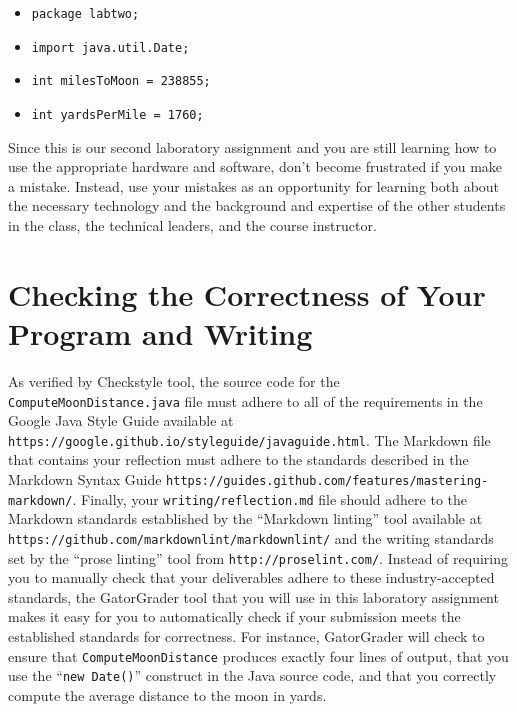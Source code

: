 \documentclass[11pt]{article}
\newcommand{\mainprogram}{\lstinline{ComputeMoonDistance}}
\newcommand{\mainprogramjava}{\lstinline{ComputeMoonDistance.java}}
\newcommand{\reflection}{\lstinline{writing/reflection.md}}
\newcommand{\command}[1]{``\lstinline{#1}''}
\newcommand{\program}[1]{\lstinline{#1}}
\newcommand{\url}[1]{\lstinline{#1}}
\newcommand{\step}[1]{``{#1}''}
\begin{document}
\vspace*{-.1in}
\begin{itemize}
  \setlength{\itemsep}{0pt}

  \item \program{package labtwo;}
  \item \program{import java.util.Date;}
  \item \program{int milesToMoon = 238855;}
  \item \program{int yardsPerMile = 1760;}

\end{itemize}
\vspace*{-.1in}

Since this is our second laboratory assignment and you are still learning how
to use the appropriate hardware and software, don't become frustrated if you
make a mistake. Instead, use your mistakes as an opportunity for learning both
about the necessary technology and the background and expertise of the other
students in the class, the technical leaders, and the course instructor.

\section*{Checking the Correctness of Your Program and Writing}

As verified by Checkstyle tool, the source code for the \mainprogramjava{} file
must adhere to all of the requirements in the Google Java Style Guide available
at \url{https://google.github.io/styleguide/javaguide.html}. The Markdown file
that contains your reflection must adhere to the standards described in the
Markdown Syntax Guide
\url{https://guides.github.com/features/mastering-markdown/}. Finally, your
\reflection{} file should adhere to the Markdown standards established by the
\step{Markdown linting} tool available at
\url{https://github.com/markdownlint/markdownlint/} and the writing standards
set by the \step{prose linting} tool from \url{http://proselint.com/}. Instead
of requiring you to manually check that your deliverables adhere to these
industry-accepted standards, the GatorGrader tool that you will use in this
laboratory assignment makes it easy for you to automatically check if your
submission meets the established standards for correctness. For instance,
GatorGrader will check to ensure that \mainprogram{} produces exactly four lines
of output, that you use the \command{new Date()} construct in the Java source
code, and that you correctly compute the average distance to the moon in yards.
\end{document}
